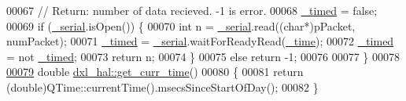 \begin{DoxyCode}
00067     \textcolor{comment}{// Return: number of data recieved. -1 is error.}
00068     \hyperlink{a00002_a10d474daa3ca42b5c5ceb6558a955ca1}{\_timed} = \textcolor{keyword}{false};
00069     \textcolor{keywordflow}{if} (\hyperlink{a00002_a785d0e35b81d779b54869cad668f9745}{\_serial}.isOpen()) \{
00070         \textcolor{keywordtype}{int} n = \hyperlink{a00002_a785d0e35b81d779b54869cad668f9745}{\_serial}.read((\textcolor{keywordtype}{char}*)pPacket, numPacket);
00071         \hyperlink{a00002_a10d474daa3ca42b5c5ceb6558a955ca1}{\_timed} = \hyperlink{a00002_a785d0e35b81d779b54869cad668f9745}{\_serial}.waitForReadyRead(\hyperlink{a00002_ae3d8733b5ca778b070218765ca0746ac}{\_time});
00072         \hyperlink{a00002_a10d474daa3ca42b5c5ceb6558a955ca1}{\_timed} = not \hyperlink{a00002_a10d474daa3ca42b5c5ceb6558a955ca1}{\_timed};
00073         \textcolor{keywordflow}{return} n;
00074     \}
00075     \textcolor{keywordflow}{else} \textcolor{keywordflow}{return} -1;
00076     
00077 \}
00078 
\hypertarget{a00010_source_l00079}{}\hyperlink{a00002_a6b6b7381c45308662fc3df6e7f74bc61}{00079} \textcolor{keywordtype}{double} \hyperlink{a00002_a6b6b7381c45308662fc3df6e7f74bc61}{dxl\_hal::get\_curr\_time}()
00080 \{
00081     \textcolor{keywordflow}{return} (\textcolor{keywordtype}{double})QTime::currentTime().msecsSinceStartOfDay();
00082 \}
\end{DoxyCode}
